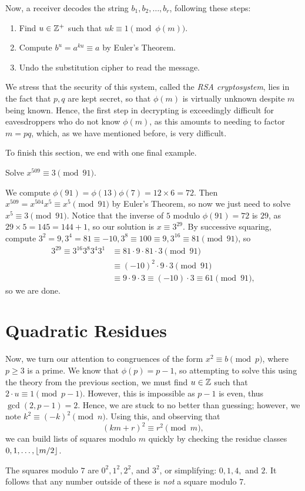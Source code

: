 \documentclass{article}
\begin{document}
Now, a receiver decodes the string $b_1, b_2,\ldots, b_r$, following these steps:
\begin{enumerate}
    \item Find $u\in\mathbb Z^+$ such that $uk \equiv 1\pmod{\phi(m)}$.
    \item Compute $b^u = a^{ku} \equiv a$ by Euler's Theorem.
    \item Undo the substitution cipher to read the message.
\end{enumerate}

We stress that the security of this system, called the \textit{RSA cryptosystem}, lies in the fact that $p,q$ are kept secret, so that $\phi(m)$ is virtually unknown despite $m$ being known. Hence, the first step in decrypting is exceedingly difficult for eavesdroppers who do not know $\phi(m)$, as this amounts to needing to factor $m = pq$, which, as we have mentioned before, is very difficult.

To finish this section, we end with one final example.
\begin{example}
Solve $x^{509} \equiv 3\pmod{91}$.
\end{example}
\begin{solution}
We compute $\phi(91) = \phi(13)\phi(7)= 12\times 6 = 72$. Then $x^{509} = x^{504}x^5 \equiv x^5 \pmod{91}$ by Euler's Theorem, so now we just need to solve $x^5\equiv 3\pmod{91}$. Notice that the inverse of $5$ modulo $\phi(91) = 72$ is $29$, as $29\times 5 = 145 = 144+1$, so our solution is $x\equiv 3^{29}$. By successive squaring, compute $3^2 = 9, 3^4 = 81\equiv -10, 3^8 \equiv 100 \equiv 9, 3^{16}\equiv 81\pmod{91}$, so
\begin{align*}
    3^{29}\equiv 3^{16}3^8 3^4 3^1 &\equiv 81\cdot 9\cdot 81\cdot 3\pmod{91} \\
    &\equiv (-10)^2 \cdot 9\cdot 3\pmod{91} \\
    &\equiv 9\cdot 9\cdot 3 \equiv (-10)\cdot 3\equiv \boxed{61}\pmod{91},
\end{align*}
so we are done.
\end{solution}

\setcounter{section}{89}
\section{Quadratic Residues}
Now, we turn our attention to congruences of the form $x^2\equiv b\pmod p$, where $p \geq 3$ is a prime. We know that $\phi(p) = p-1$, so attempting to solve this using the theory from the previous section, we must find $u\in\mathbb Z$ such that $2\cdot u \equiv 1\pmod{p-1}$. However, this is impossible as $p-1$ is even, thus $\gcd(2, p-1) = 2$. Hence, we are stuck to no better than guessing; however, we note $k^2 \equiv (-k)^2 \pmod n$. Using this, and observing that
$$(km+r)^2 \equiv r^2\pmod m,$$
we can build lists of squares modulo $m$ quickly by checking the residue classes $0, 1, \ldots, \left\lfloor m/2\right\rfloor$.
\begin{example}
The squares modulo $7$ are $0^2, 1^2, 2^2$, and $3^2$, or simplifying: $0, 1, 4,$ and $2$. It follows that any number outside of these is \textit{not} a square modulo $7$.
\end{example}
\end{document}
